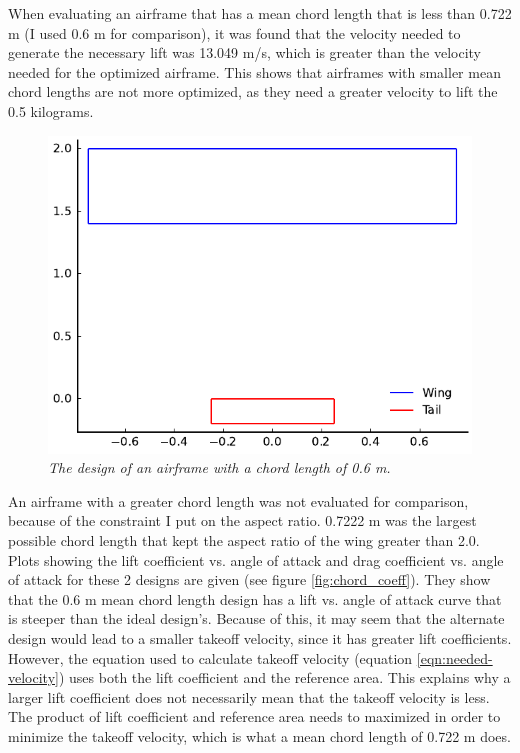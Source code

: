 \documentclass[journal]{new-aiaa}
\begin{document}
	When evaluating an airframe that has a mean chord length that is less than 0.722 m (I used 0.6 m for comparison), it was found that the velocity needed to generate the necessary lift was 13.049 m/s, which is greater than the velocity needed for the optimized airframe. This shows that airframes with smaller mean chord lengths are not more optimized, as they need a greater velocity to lift the 0.5 kilograms.\\
	
	\begin{figure}[H]
		\centering
		\includegraphics{../graphics/chord_design.pdf}
		\caption{\emph{The design of an airframe with a chord length of 0.6 m.}}
		\label{fig:chord_design}
	\end{figure}
	
	An airframe with a greater chord length was not evaluated for comparison, because of the constraint I put on the aspect ratio. 0.7222 m was the largest possible chord length that kept the aspect ratio of the wing greater than 2.0.\\
	
	Plots showing the lift coefficient vs. angle of attack and drag coefficient vs. angle of attack for these 2 designs are given (see figure \ref{fig:chord_coeff}). They show that the 0.6 m mean chord length design has a lift vs. angle of attack curve that is steeper than the ideal design's. Because of this, it may seem that the alternate design would lead to a smaller takeoff velocity, since it has greater lift coefficients. However, the equation used to calculate takeoff velocity (equation  \ref{eqn:needed-velocity}) uses both the lift coefficient and the reference area. This explains why a larger lift coefficient does not necessarily mean that the takeoff velocity is less. The product of lift coefficient and reference area needs to maximized in order to minimize the takeoff velocity, which is what a mean chord length of 0.722 m does.
	
\end{document}
